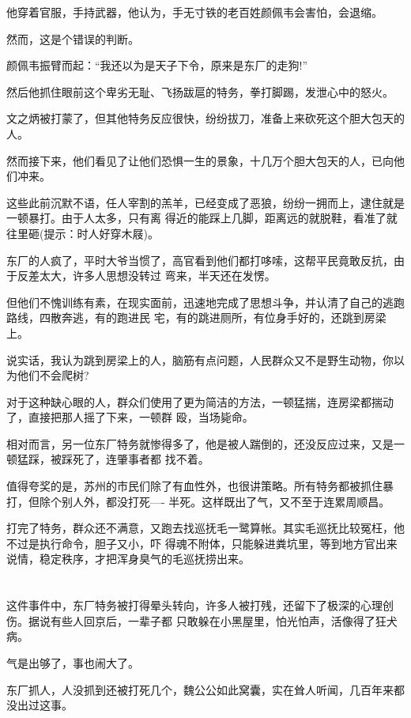 \documentclass[11pt,a4paper,onecolumn]{article}
\begin{document}
他穿着官服，手持武器，他认为，手无寸铁的老百姓颜佩韦会害怕，会退缩。

然而，这是个错误的判断。

颜佩韦振臂而起：``我还以为是天子下令，原来是东厂的走狗!''

然后他抓住眼前这个卑劣无耻、飞扬跋扈的特务，拳打脚踢，发泄心中的怒火。

文之炳被打蒙了，但其他特务反应很快，纷纷拔刀，准备上来砍死这个胆大包天的人。

然而接下来，他们看见了让他们恐惧一生的景象，十几万个胆大包天的人，已向他们冲来。

这些此前沉默不语，任人宰割的羔羊，已经变成了恶狼，纷纷一拥而上，逮住就是一顿暴打。由于人太多，只有离
得近的能踩上几脚，距离远的就脱鞋，看准了就往里砸(提示：时人好穿木屐)。

东厂的人疯了，平时大爷当惯了，高官看到他们都打哆嗦，这帮平民竟敢反抗，由于反差太大，许多人思想没转过
弯来，半天还在发愣。

但他们不愧训练有素，在现实面前，迅速地完成了思想斗争，并认清了自己的逃跑路线，四散奔逃，有的跑进民
宅，有的跳进厕所，有位身手好的，还跳到房梁上。

说实话，我认为跳到房梁上的人，脑筋有点问题，人民群众又不是野生动物，你以为他们不会爬树?

对于这种缺心眼的人，群众们使用了更为简洁的方法，一顿猛揣，连房梁都揣动了，直接把那人摇了下来，一顿群
殴，当场毙命。

相对而言，另一位东厂特务就惨得多了，他是被人踹倒的，还没反应过来，又是一顿猛踩，被踩死了，连肇事者都
找不着。

值得夸奖的是，苏州的市民们除了有血性外，也很讲策略。所有特务都被抓住暴打，但除个别人外，都没打死----
半死。这样既出了气，又不至于连累周顺昌。

打完了特务，群众还不满意，又跑去找巡抚毛一鹭算帐。其实毛巡抚比较冤枉，他不过是执行命令，胆子又小，吓
得魂不附体，只能躲进粪坑里，等到地方官出来说情，稳定秩序，才把浑身臭气的毛巡抚捞出来。

\section[\thesection]{}

这件事件中，东厂特务被打得晕头转向，许多人被打残，还留下了极深的心理创伤。据说有些人回京后，一辈子都
只敢躲在小黑屋里，怕光怕声，活像得了狂犬病。

气是出够了，事也闹大了。

东厂抓人，人没抓到还被打死几个，魏公公如此窝囊，实在耸人听闻，几百年来都没出过这事。
\end{document}
